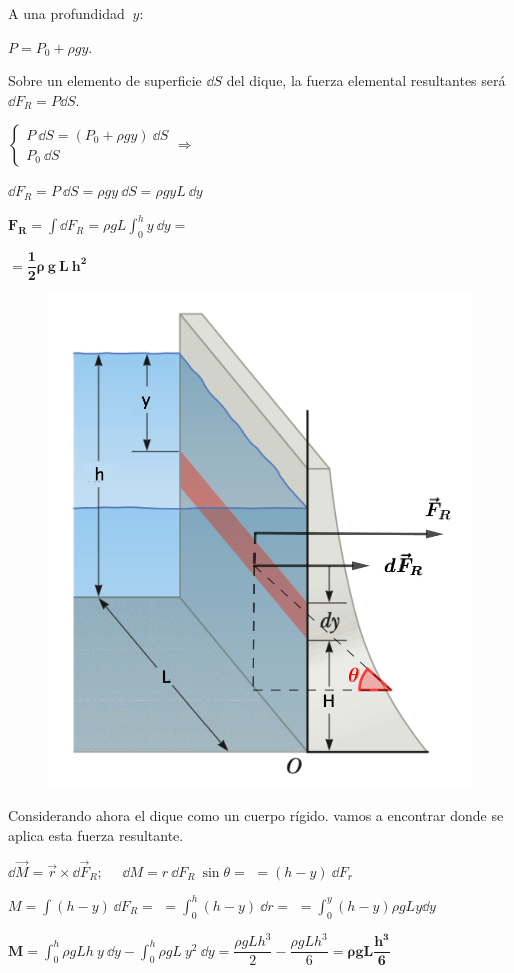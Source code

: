 \begin{multicols}{2}
A una profundidad $\ y:$ 

$P=P_0+\rho g y.\ $  

Sobre un elemento de superficie $\dd S$ del dique, la fuerza elemental resultantes será  $\dd F_R=P\dd S$.

$\begin{cases} P \ \dd S=(P_0+\rho g y)\ \dd S \\ P_0 \ \dd S \end{cases} \Rightarrow$ 

$\dd F_R= P \ \dd S=\rho g y \ \dd S =\rho g y L \ \dd y$

$\displaystyle \boldsymbol{F_R}=\int \dd F_R =\rho g L \int_0^h y \ \dd y= $ 

$=\boldsymbol{\dfrac 1 2 \rho \ g \ L \ h^2}$


\begin{figure}[H]
	\centering
	\includegraphics[width=.55\textwidth]{imagenes/imagenes07/T07IM13.png}
\end{figure}
\end{multicols}
Considerando ahora el dique como un cuerpo rígido. vamos a encontrar donde se aplica esta fuerza resultante.



$\dd \overrightarrow{M}=\vec r \times \dd \vec F_R;\quad$
$\dd M=r\  \dd F_R\  \sin \theta=$
$=(h-y) \ \dd F_r$

$M=\int (h-y)\ \dd F_R=$
$=\displaystyle \int_0^h (h-y)\ \dd r=$
$\displaystyle =\int_0^y (h-y) \rho g L y \dd y$

$\boldsymbol{M=}\displaystyle \int_0^h \rho g L h \ y \ \dd y -\int_0^h \rho g L \ y^2 \ \dd y=\dfrac{\rho g L h^3}2-\dfrac{\rho g L h^3}6 \boldsymbol{=\rho g L \dfrac {h^3}6}$

